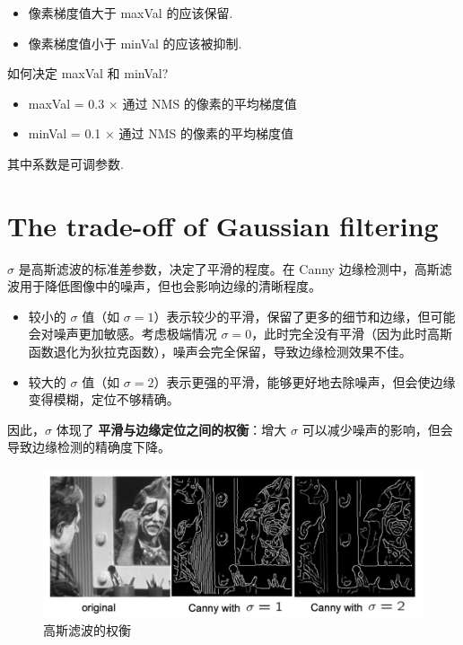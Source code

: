 \begin{itemize}
    \item 像素梯度值大于 maxVal 的应该保留.
    \item 像素梯度值小于 minVal 的应该被抑制.
\end{itemize}

如何决定 maxVal 和 minVal?

\begin{itemize}
    \item maxVal = 0.3 $\times$ 通过 NMS 的像素的平均梯度值
    \item minVal = 0.1 $\times$ 通过 NMS 的像素的平均梯度值
\end{itemize}

其中系数是可调参数.

\section{The trade-off of Gaussian filtering}

$\sigma$ 是高斯滤波的标准差参数，决定了平滑的程度。在 Canny 边缘检测中，高斯滤波用于降低图像中的噪声，但也会影响边缘的清晰程度。

\begin{itemize}
    \item 较小的 $\sigma$ 值（如 $\sigma = 1$）表示较少的平滑，保留了更多的细节和边缘，但可能会对噪声更加敏感。考虑极端情况 $\sigma = 0$，此时完全没有平滑（因为此时高斯函数退化为狄拉克函数），噪声会完全保留，导致边缘检测效果不佳。
    \item 较大的 $\sigma$ 值（如 $\sigma = 2$）表示更强的平滑，能够更好地去除噪声，但会使边缘变得模糊，定位不够精确。
\end{itemize}

因此，$\sigma$ 体现了 \textbf{平滑与边缘定位之间的权衡}：增大 $\sigma$ 可以减少噪声的影响，但会导致边缘检测的精确度下降。

\begin{figure}[htbp]
    \centering
	\includegraphics[scale=0.2]{figures/tradeoff-in-gauss-filtering.png}
	\caption{高斯滤波的权衡}
\end{figure}

